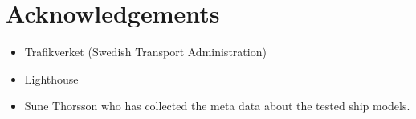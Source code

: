 \section*{Acknowledgements}
\label{se:acknowledgements}

\begin{itemize}
    \item Trafikverket (Swedish Transport Administration)
    \item Lighthouse
    \item Sune Thorsson who has collected the meta data about the tested ship models.
\end{itemize}




